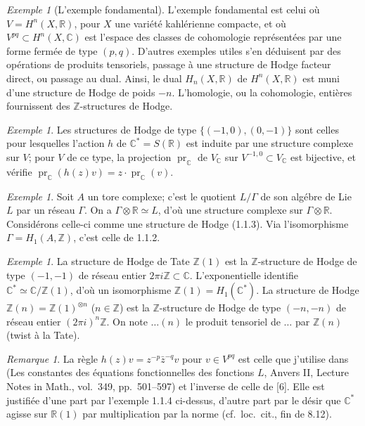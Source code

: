 \documentclass[12pt,a4paper]{article}
\theoremstyle{plain}
\theoremstyle{definition}
\theoremstyle{remark}
\newtheorem{remark}[theorem]{Remarque}
\newtheorem{example}[theorem]{Exemple}
\DeclareMathOperator{\pr}{pr}
\newcommand{\ZZ}{\mathbb{Z}}
\newcommand{\RR}{\mathbb{R}}
\newcommand{\CC}{\mathbb{C}}
\begin{document}
\begin{example}[L'exemple fondamental]
L'exemple fondamental est celui o\`u $V = H^n(X,\RR)$, pour $X$ une vari\'et\'e kahl\'erienne compacte, et o\`u $V^{pq} \subset H^n(X,\CC)$ est l'espace des classes de cohomologie repr\'esent\'ees par une forme ferm\'ee de type $(p,q)$. D'autres exemples utiles s'en d\'eduisent par des op\'erations de produits tensoriels, passage \`a une structure de Hodge facteur direct, ou passage au dual. Ainsi, le dual $H_n(X,\RR)$ de $H^n(X,\RR)$ est muni d'une structure de Hodge de poids $-n$. L'homologie, ou la cohomologie, enti\`eres fournissent des $\ZZ$-structures de Hodge.
\end{example}

\begin{example}
Les structures de Hodge de type $\{(-1,0),(0,-1)\}$ sont celles pour lesquelles l'action $h$ de $\CC^* = S(\RR)$ est induite par une structure complexe sur $V$; pour $V$ de ce type, la projection $\pr_{\CC}$ de $V_{\CC}$ sur $V^{-1,0} \subset V_{\CC}$ est bijective, et v\'erifie $\pr_{\CC}(h(z)v) = z \cdot \pr_{\CC}(v)$.
\end{example}

\begin{example}
Soit $A$ un tore complexe; c'est le quotient $L/\Gamma$ de son alg\'ebre de Lie $L$ par un r\'eseau $\Gamma$. On a $\Gamma \otimes \RR \simeq L$, d'o\`u une structure complexe sur $\Gamma \otimes \RR$. Consid\'erons celle-ci comme une structure de Hodge (1.1.3). Via l'isomorphisme $\Gamma = H_1(A,\ZZ)$, c'est celle de 1.1.2.
\end{example}

\begin{example}
La structure de Hodge de Tate $\ZZ(1)$ est la $\ZZ$-structure de Hodge de type $(-1,-1)$ de r\'eseau entier $2\pi i \ZZ \subset \CC$. L'exponentielle identifie $\CC^* \simeq \CC/\ZZ(1)$, d'o\`u un isomorphisme $\ZZ(1) = H_1(\CC^*)$. La structure de Hodge $\ZZ(n) = \ZZ(1)^{\otimes n}$ ($n \in \ZZ$) est la $\ZZ$-structure de Hodge de type $(-n,-n)$ de r\'eseau entier $(2\pi i)^n \ZZ$. On note $\dots(n)$ le produit tensoriel de $\dots$ par $\ZZ(n)$ (twist \`a la Tate).
\end{example}

\begin{remark}
La r\`egle $h(z)v = z^{-p}\bar{z}^{-q}v$ pour $v \in V^{pq}$ est celle que j'utilise dans (Les constantes des \'equations fonctionnelles des fonctions $L$, Anvers II, Lecture Notes in Math., vol.~349, pp.~501--597) et l'inverse de celle de [6]. Elle est justifi\'ee d'une part par l'exemple 1.1.4 ci-dessus, d'autre part par le d\'esir que $\CC^*$ agisse sur $\RR(1)$ par multiplication par la norme (cf.~loc.~cit., fin de 8.12).
\end{remark}
\end{document}
